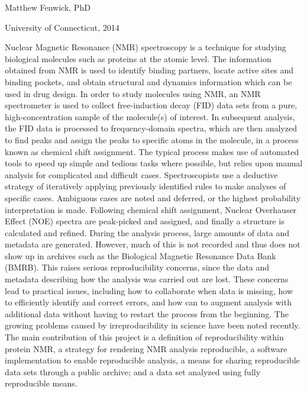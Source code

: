 \pagestyle{myabstract} %
\thispagestyle{empty} %

\begin{center}
  {\LARGE \mattftitle{}}
  
  \vspace{2cm}

  Matthew Fenwick, PhD
  
  \vspace{0.5cm}

  University of Connecticut, 2014
  
  \vspace{1in}
\end{center}

\thispagestyle{empty}
Nuclear Magnetic Resonance (NMR) spectroscopy is a technique for studying 
biological molecules such as proteins at the atomic level.  
The information obtained from NMR is used to identify 
binding partners, locate active sites and binding pockets, and obtain 
structural and dynamics information which can be used in drug design.  In 
order to study molecules using NMR, an NMR spectrometer is used to collect 
free-induction decay (FID) data sets from a pure, high-concentration sample 
of the molecule(s) of interest.  In subsequent analysis, the FID data is 
processed to frequency-domain spectra, which are then analyzed to find peaks 
and assign the peaks to specific atoms in the molecule, in a process known as 
chemical shift assignment.  The typical process makes use of automated tools to 
speed up simple and tedious tasks where possible, but relies upon manual 
analysis for complicated and difficult cases.  Spectroscopists use a deductive 
strategy of iteratively applying previously identified rules to make analyses 
of specific cases.  Ambiguous cases are noted and deferred, or the highest 
probability interpretation is made.  Following chemical shift assignment, 
Nuclear Overhauser Effect (NOE) spectra are peak-picked and assigned, and 
finally a structure is 
calculated and refined.  During the analysis process, large amounts of data 
and metadata are generated.  However, much of this is not recorded and thus 
does not show up in archives such as the Biological Magnetic Resonance Data
Bank (BMRB).  This raises serious 
reproducibility concerns, since the data and metadata describing how the 
analysis was carried out are lost.  These concerns lead to practical issues,
including how to collaborate when data is missing, how to efficiently identify 
and correct errors, and how can to augment analysis with additional data  
without having to restart the process from the beginning.
The growing problems caused by irreproducibility in science have been noted 
recently.  The main contribution of this project is a definition of 
reproducibility within protein NMR, a strategy for rendering NMR analysis 
reproducible, a software implementation to enable reproducible analysis, a 
means for sharing reproducible data sets through a public archive; and a data 
set analyzed using fully reproducible means.

\clearpage
\pagestyle{plain}

